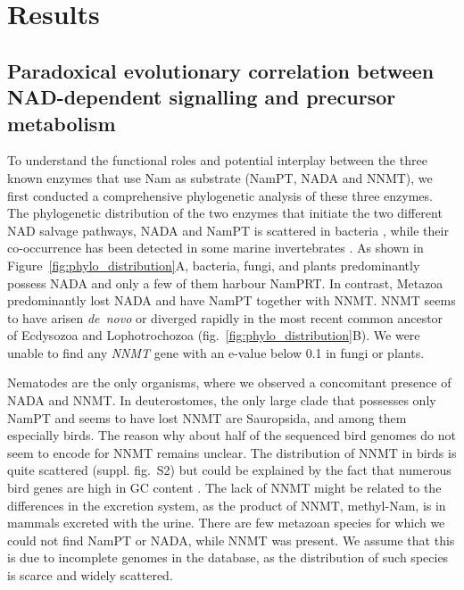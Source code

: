 
\section{Results}

\subsection{Paradoxical evolutionary correlation between NAD-dependent signalling and precursor metabolism}


To understand the functional roles and potential interplay between the three known enzymes that use Nam as substrate (NamPT, NADA and NNMT), we first conducted a comprehensive phylogenetic analysis of these three enzymes. The phylogenetic distribution of the two enzymes that initiate the two different NAD salvage pathways, NADA and NamPT is scattered in bacteria \cite{Gazzaniga2009}, while their co-occurrence has been detected in some marine invertebrates \cite{Gossmann2012FEBS}. As shown in Figure~\ref{fig:phylo_distribution}A, bacteria, fungi, and plants predominantly possess NADA and only a few of them harbour NamPRT. In contrast, Metazoa predominantly lost NADA and have NamPT together with NNMT. NNMT seems to have arisen \textit{de~novo} or diverged rapidly in the most recent common ancestor of Ecdysozoa and Lophotrochozoa (fig.~\ref{fig:phylo_distribution}B). We were unable to find any \textit{NNMT} gene with an e-value below 0.1 in fungi or plants.

Nematodes are the only organisms, where we observed a concomitant presence of NADA and NNMT. In deuterostomes, the only large clade that possesses only NamPT and seems to have lost NNMT are Sauropsida, and among them especially birds. The reason why about half of the sequenced bird genomes do not seem to encode for NNMT remains unclear. The distribution of NNMT in birds is quite scattered (suppl. fig.~S2) but could be explained by the fact that numerous bird genes are high in GC content \cite{Hron2015}. The lack of NNMT might be related to the differences in the excretion system, as the product of NNMT, methyl-Nam, is in mammals excreted with the urine. There are few metazoan species for which we could not find NamPT or NADA, while NNMT was present. We assume that this is due to incomplete genomes in the database, as the distribution of such species is scarce and widely scattered.

